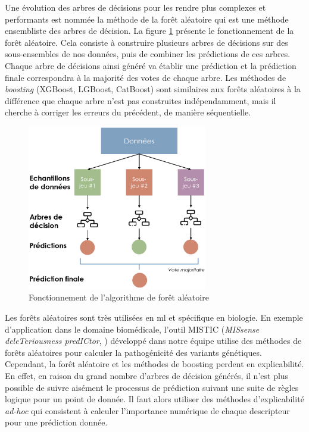 Une évolution des arbres de décisions pour les rendre plus complexes et performants est nommée la méthode de la forêt aléatoire qui est une méthode ensembliste des arbres de décision. La figure \ref{fig:random-forest} présente le fonctionnement de la forêt aléatoire. Cela consiste à construire plusieurs arbres de décisions sur des sous-ensembles de nos données, puis de combiner les prédictions de ces arbres. Chaque arbre de décisions ainsi généré va établir une prédiction et la prédiction finale correspondra à la majorité des votes de chaque arbre. Les méthodes de \textit{boosting}  (XGBoost, LGBoost, CatBoost) sont similaires aux forêts aléatoires à la différence que chaque arbre n'est pas construites indépendamment, mais il cherche à corriger les erreurs du précédent, de manière séquentielle.
\begin{figure}[!htbp]
 \centering
 \includegraphics[width=0.7\textwidth]{figures/random_forest.png}
 \caption[Fonctionnement de l'algorithme de forêt aléatoire]{Fonctionnement de l'algorithme de forêt aléatoire}
 \label{fig:random-forest}
\end{figure}
Les forêts aléatoires sont très utilisées en \gls{ml} et spécifique en biologie. En exemple d'application dans le domaine biomédicale, l'outil MISTIC (\textit{MISsense deleTeriousness predICtor}, \cite{chennen_mistic_2020}) développé dans notre équipe utilise des méthodes de forêts aléatoires pour calculer la pathogénicité des variants génétiques. Cependant, la forêt aléatoire et les méthodes de boosting perdent en explicabilité. En effet, en raison du grand nombre d'arbres de décision générés, il n'est plus possible de suivre aisément le processus de prédiction suivant une suite de règles logique pour un point de donnée. Il faut alors utiliser des méthodes d'explicabilité \textit{ad-hoc} qui consistent à calculer l'importance numérique de chaque descripteur pour une prédiction donnée.

